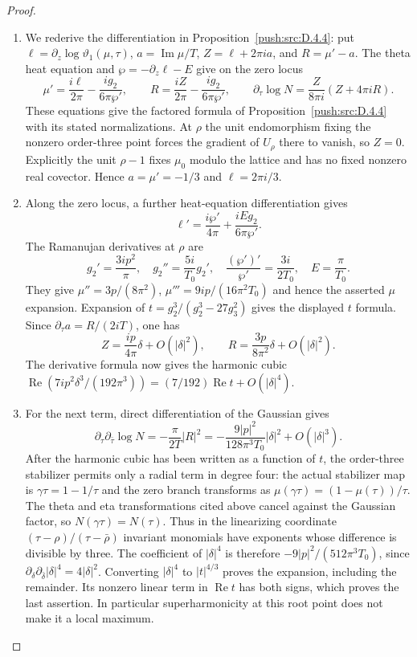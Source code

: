 \begin{proof}
\begin{enumerate}[label=\arabic*.,leftmargin=*]
\item We rederive the differentiation in Proposition~\ref{push:src:D.4.4}: put
$\ell=\partial_z\log\vartheta_1(\mu,\tau)$,
$a=\operatorname{Im}\mu/T$, $Z=\ell+2\pi ia$, and
$R=\mu'-a$. The theta heat equation and
$\wp=-\partial_z\ell-E$ give on the zero locus
\[
 \mu'=\frac{i\ell}{2\pi}-\frac{ig_2}{6\pi\wp'},\qquad
 R=\frac{iZ}{2\pi}-\frac{ig_2}{6\pi\wp'},\qquad
 \partial_\tau\log N=\frac{Z}{8\pi i}(Z+4\pi iR).
\]
These equations give the factored formula of Proposition~\ref{push:src:D.4.4}
with its stated normalizations. At $\rho$ the unit endomorphism fixing the
nonzero order-three point forces the gradient of $U_\rho$ there to
vanish, so $Z=0$. Explicitly the unit $\rho-1$ fixes $\mu_0$ modulo
the lattice and has no fixed nonzero real covector. Hence
$a=\mu'=-1/3$ and $\ell=2\pi i/3$.

\item Along the zero locus, a further heat-equation differentiation gives
\[
 \ell'=\frac{i\wp'}{4\pi}+\frac{iEg_2}{6\pi\wp'}.
\]
The Ramanujan derivatives at $\rho$ are
\[
 g_2'=\frac{3ip^2}{\pi},\quad
 g_2''=\frac{5i}{T_0}g_2',\quad
 \frac{(\wp')'}{\wp'}=\frac{3i}{2T_0},\quad E=\frac\pi{T_0}.
\]
They give $\mu''=3p/(8\pi^2)$,
$\mu'''=9ip/(16\pi^2T_0)$ and hence the asserted $\mu$ expansion.
Expansion of $t=g_2^3/(g_2^3-27g_3^2)$ gives the displayed $t$
formula. Since $\partial_\tau a=R/(2iT)$, one has
\[
 Z=\frac{ip}{4\pi}\delta+O(|\delta|^2),\qquad
 R=\frac{3p}{8\pi^2}\delta+O(|\delta|^2).
\]
The derivative formula now gives the harmonic cubic
$\operatorname{Re}(7ip^2\delta^3/(192\pi^3))=(7/192)
\operatorname{Re}t+O(|\delta|^4)$.

\item For the next term, direct differentiation of the Gaussian gives
\[
 \partial_\tau\partial_{\bar\tau}\log N
       =-\frac\pi{2T}|R|^2
       =-\frac{9|p|^2}{128\pi^3T_0}|\delta|^2+O(|\delta|^3).
\]
After the harmonic cubic has been written as a function of $t$, the
order-three stabilizer permits only a radial term in degree four:
the actual stabilizer map is $\gamma\tau=1-1/\tau$ and the zero
branch transforms as
$\mu(\gamma\tau)=(1-\mu(\tau))/\tau$.
The theta and eta transformations cited above cancel against the
Gaussian factor, so $N(\gamma\tau)=N(\tau)$.
Thus
in the linearizing coordinate
$(\tau-\rho)/(\tau-\bar\rho)$ invariant monomials have exponents
whose difference is divisible by three. The coefficient of
$|\delta|^4$ is therefore $-9|p|^2/(512\pi^3T_0)$, since
$\partial_\delta\partial_{\bar\delta}|\delta|^4=4|\delta|^2$.
Converting $|\delta|^4$ to $|t|^{4/3}$ proves the expansion, including
the remainder. Its nonzero linear term in $\operatorname{Re}t$
has both signs, which proves the last assertion. In particular
superharmonicity at this root point does not make it a local maximum.
\end{enumerate}
\end{proof}



